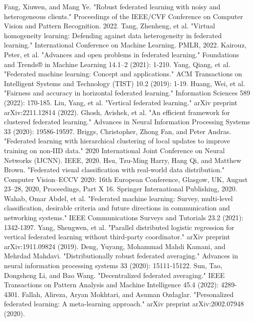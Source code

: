 \documentclass[conference]{IEEEtran}
\begin{document}
\begin{thebibliography}{00}
     Fang, Xiuwen, and Mang Ye. "Robust federated learning with noisy and heterogeneous clients." Proceedings of the IEEE/CVF Conference on Computer Vision and Pattern Recognition. 2022.
     Tang, Zhenheng, et al. "Virtual homogeneity learning: Defending against data heterogeneity in federated learning." International Conference on Machine Learning. PMLR, 2022.
     Kairouz, Peter, et al. "Advances and open problems in federated learning." Foundations and Trends® in Machine Learning 14.1–2 (2021): 1-210.
     Yang, Qiang, et al. "Federated machine learning: Concept and applications." ACM Transactions on Intelligent Systems and Technology (TIST) 10.2 (2019): 1-19.
     Huang, Wei, et al. "Fairness and accuracy in horizontal federated learning." Information Sciences 589 (2022): 170-185.
     Liu, Yang, et al. "Vertical federated learning." arXiv preprint arXiv:2211.12814 (2022).
     Ghosh, Avishek, et al. "An efficient framework for clustered federated learning." Advances in Neural Information Processing Systems 33 (2020): 19586-19597.
     Briggs, Christopher, Zhong Fan, and Peter Andras. "Federated learning with hierarchical clustering of local updates to improve training on non-IID data." 2020 International Joint Conference on Neural Networks (IJCNN). IEEE, 2020.
     Hsu, Tzu-Ming Harry, Hang Qi, and Matthew Brown. "Federated visual classification with real-world data distribution." Computer Vision–ECCV 2020: 16th European Conference, Glasgow, UK, August 23–28, 2020, Proceedings, Part X 16. Springer International Publishing, 2020.
     Wahab, Omar Abdel, et al. "Federated machine learning: Survey, multi-level classification, desirable criteria and future directions in communication and networking systems." IEEE Communications Surveys and Tutorials 23.2 (2021): 1342-1397.
     Yang, Shengwen, et al. "Parallel distributed logistic regression for vertical federated learning without third-party coordinator." arXiv preprint arXiv:1911.09824 (2019).
     Deng, Yuyang, Mohammad Mahdi Kamani, and Mehrdad Mahdavi. "Distributionally robust federated averaging." Advances in neural information processing systems 33 (2020): 15111-15122.
     Sun, Tao, Dongsheng Li, and Bao Wang. "Decentralized federated averaging." IEEE Transactions on Pattern Analysis and Machine Intelligence 45.4 (2022): 4289-4301.
     Fallah, Alireza, Aryan Mokhtari, and Asuman Ozdaglar. "Personalized federated learning: A meta-learning approach." arXiv preprint arXiv:2002.07948 (2020).  

\end{thebibliography}
\end{document}
